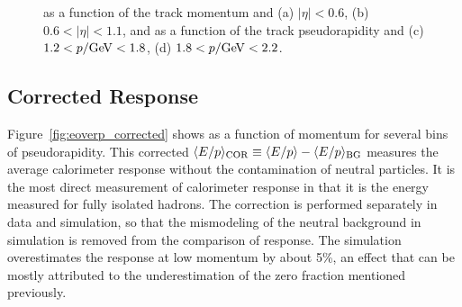 \begin{figure}[htbp]
{}
\caption{\epbg as a function of the track momentum and (a) $|\eta| < 0.6$, (b) $0.6 < |\eta| < 1.1$, and as a function of the track pseudorapidity and (c) $1.2 < p / \GeV < 1.8$, (d) $1.8 < p / \GeV < 2.2$.}
\label{fig:eoverp_background}
\end{figure}

\subsection{Corrected Response}
\label{sec:response}

Figure~\ref{fig:eoverp_corrected} shows \epcor as a function of momentum for several bins of pseudorapidity. 
This corrected $\langle E/p \rangle_{\mathrm{COR}} \equiv \langle E/p \rangle - \langle E/p \rangle_{\mathrm{BG}}$ measures the average calorimeter response without the contamination of neutral particles. 
It is the most direct measurement of calorimeter response in that it is the energy measured for fully isolated hadrons. 
The correction is performed separately in data and simulation, so that the mismodeling of the neutral background in simulation is removed from the comparison of response. 
The simulation overestimates the response at low momentum by about 5\%, an effect that can be mostly attributed to the underestimation of the zero fraction mentioned previously.

